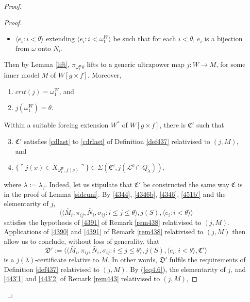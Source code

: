 \documentclass[12pt]{article}
\numberwithin{equation}{section}
\begin{document}
\begin{proof}
\begin{proof}
\begin{itemize}
    \item $\langle e_i : i < \theta \rangle$ extending $\langle e_i : i < \omega_1^W \rangle$ be such that for each $i < \theta$, $e_i$ is a bijection from $\omega$ onto $N_i$.
\end{itemize}
Then by Lemma \ref{lift}, $\pi_{\omega_1^W\theta}$ lifts to a generic ultrapower map $j : W \longrightarrow M$, for some inner model $M$ of $W[g \times f]$. Moreover, 
\begin{enumerate}[label=(\alph*)]
    \item\label{451a'} $crit(j) = \omega_1^W$, and
    \item\label{451b'} $j(\omega_1^W) = \theta$.
\end{enumerate}

Within a suitable forcing extension $W^*$ of $W[g \times f]$, there is $\mathfrak{C}'$ such that 
\begin{enumerate}[label=(\alph*)]
    \setcounter{enumi}{2}
    \item $\mathfrak{C}'$ satisfies \ref{cdlast} to \ref{cdrlast} of Definition \ref{def437} relativised to $(j, M)$, and
    \item $\{\ulcorner j(x) \in \dot{X}_{\omega_1^W, j(\nu)} \urcorner\} \in \Sigma(\mathfrak{C}', j(\mathcal{L}^o \cap Q_{\lambda}))$,
\end{enumerate} 
where $\lambda := \lambda_f$. Indeed, let us stipulate that $\mathfrak{C}'$ be constructed the same way $\mathfrak{C}$ is in the proof of Lemma \ref{sideuni}. By \ref{4344}, \ref{4346b}, \ref{4346}, \ref{451b'} and the elementarity of $j$, 
\begin{equation*}
    \langle \langle \bar{M}_i, \pi_{ij}, \bar{N}_i, \sigma_{ij} : i \leq j \leq \theta \rangle, j(S), \langle e_i : i < \theta \rangle \rangle
\end{equation*}
satisfies the hypothesis of \ref{4391} of Remark \ref{rem438} relativised to $(j, M)$. Applications of \ref{4390} and \ref{4391} of Remark \ref{rem438} relativised to $(j, M)$ then allow us to conclude, without loss of generality, that
\begin{equation*}
    \mathfrak{D}' := \langle \langle \bar{M}_i, \pi_{ij}, \bar{N}_i, \sigma_{ij} : i \leq j \leq \theta \rangle, j(S), \langle e_i : i < \theta \rangle, \mathfrak{C}' \rangle
\end{equation*}
is a $j(\lambda)$-certificate relative to $M$. In other words, $\mathfrak{D}'$ fulfils the requirements of Definition \ref{def437} relativised to $(j, M)$. By (\ref{eq4.6}), the elementarity of $j$, and \ref{443'1} and \ref{443'2} of Remark \ref{rem443} relativised to $(j, M)$, 

\end{proof}
\end{proof}
\end{document}
